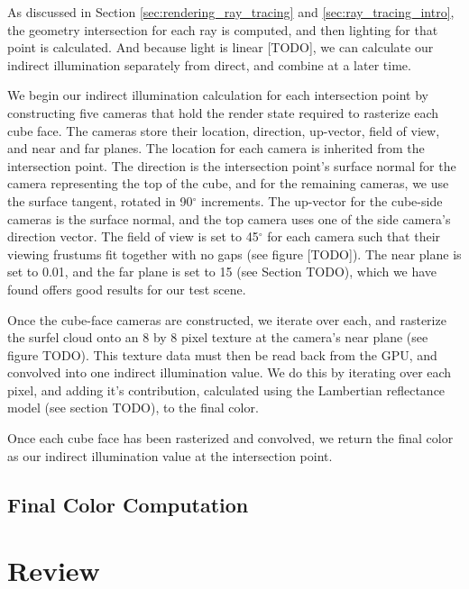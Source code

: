 As discussed in Section \ref{sec:rendering_ray_tracing} and \ref{sec:ray_tracing_intro}, the geometry intersection for each ray is computed, and then lighting for that point is calculated. And because light is linear [TODO], we can calculate our indirect illumination separately from direct, and combine at a later time.

We begin our indirect illumination calculation for each intersection point by constructing five cameras that hold the render state required to rasterize each cube face. The cameras store their location, direction, up-vector, field of view, and near and far planes. The location for each camera is inherited from the intersection point. The direction is the intersection point's surface normal for the camera representing the top of the cube, and for the remaining cameras, we use the surface tangent, rotated in 90$^\circ$ increments. The up-vector for the cube-side cameras is the surface normal, and the top camera uses one of the side camera's direction vector. The field of view is set to 45$^\circ$ for each camera such that their viewing frustums fit together with no gaps (see figure [TODO]). The near plane is set to 0.01, and the far plane is set to 15 (see Section TODO), which we have found offers good results for our test scene.

Once the cube-face cameras are constructed, we iterate over each, and rasterize the surfel cloud onto an 8 by 8 pixel texture at the camera's near plane (see figure TODO). This texture data must then be read back from the GPU, and convolved into one indirect illumination value. We do this by iterating over each pixel, and adding it's contribution, calculated using the Lambertian reflectance model (see section TODO), to the final color.

Once each cube face has been rasterized and convolved, we return the final color as our indirect illumination value at the intersection point.

\subsection{Final Color Computation}

\section{Review}

